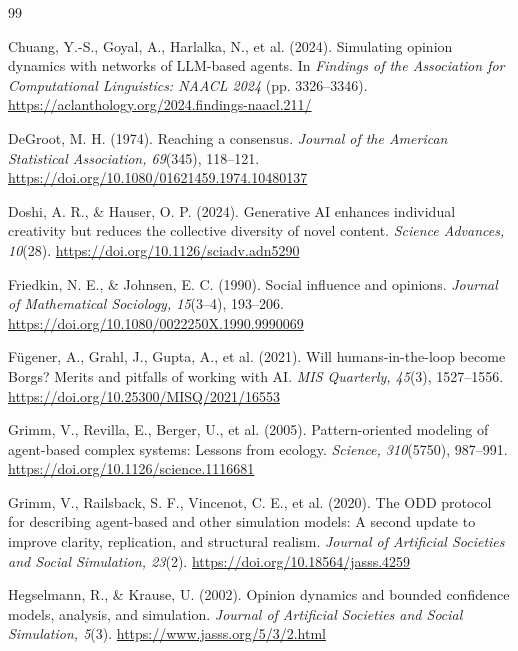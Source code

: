\documentclass[11pt,a4paper]{article}
\begin{document}
\begingroup
\RaggedRight
\begin{thebibliography}{99}
\RaggedRight
{}

Chuang, Y.-S., Goyal, A., Harlalka, N., et al. (2024). Simulating opinion dynamics with networks of LLM-based agents. In \textit{Findings of the Association for Computational Linguistics: NAACL 2024} (pp. 3326--3346). \url{https://aclanthology.org/2024.findings-naacl.211/}

DeGroot, M. H. (1974). Reaching a consensus. \textit{Journal of the American Statistical Association, 69}(345), 118--121. \url{https://doi.org/10.1080/01621459.1974.10480137}

Doshi, A. R., \& Hauser, O. P. (2024). Generative AI enhances individual creativity but reduces the collective diversity of novel content. \textit{Science Advances, 10}(28). \url{https://doi.org/10.1126/sciadv.adn5290}

Friedkin, N. E., \& Johnsen, E. C. (1990). Social influence and opinions. \textit{Journal of Mathematical Sociology, 15}(3--4), 193--206. \url{https://doi.org/10.1080/0022250X.1990.9990069}

F\"ugener, A., Grahl, J., Gupta, A., et al. (2021). Will humans-in-the-loop become Borgs? Merits and pitfalls of working with AI. \textit{MIS Quarterly, 45}(3), 1527--1556. \url{https://doi.org/10.25300/MISQ/2021/16553}

Grimm, V., Revilla, E., Berger, U., et al. (2005). Pattern-oriented modeling of agent-based complex systems: Lessons from ecology. \textit{Science, 310}(5750), 987--991. \url{https://doi.org/10.1126/science.1116681}

Grimm, V., Railsback, S. F., Vincenot, C. E., et al. (2020). The ODD protocol for describing agent-based and other simulation models: A second update to improve clarity, replication, and structural realism. \textit{Journal of Artificial Societies and Social Simulation, 23}(2). \url{https://doi.org/10.18564/jasss.4259}

Hegselmann, R., \& Krause, U. (2002). Opinion dynamics and bounded confidence models, analysis, and simulation. \textit{Journal of Artificial Societies and Social Simulation, 5}(3). \url{https://www.jasss.org/5/3/2.html}


\end{thebibliography}
\end{document}
